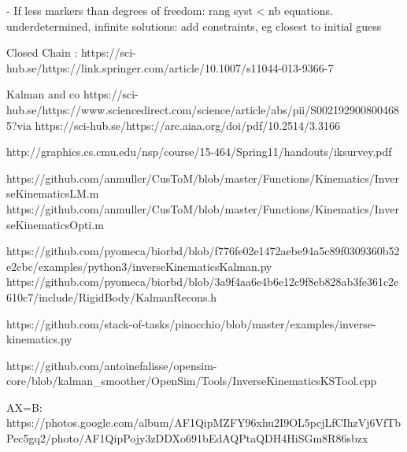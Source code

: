 - If less markers than degrees of freedom: rang syst < nb equations. underdetermined, infinite solutions: add constraints, eg closest to initial guess 




Closed Chain :
https://sci-hub.se/https://link.springer.com/article/10.1007/s11044-013-9366-7



Kalman and co
https://sci-hub.se/https://www.sciencedirect.com/science/article/abs/pii/S0021929008004685?via%
https://sci-hub.se/https://arc.aiaa.org/doi/pdf/10.2514/3.3166



http://graphics.cs.cmu.edu/nsp/course/15-464/Spring11/handouts/iksurvey.pdf

https://github.com/anmuller/CusToM/blob/master/Functions/Kinematics/InverseKinematicsLM.m 
https://github.com/anmuller/CusToM/blob/master/Functions/Kinematics/InverseKinematicsOpti.m

https://github.com/pyomeca/biorbd/blob/f776fe02e1472aebe94a5c89f0309360b52e2cbc/examples/python3/inverseKinematicsKalman.py
https://github.com/pyomeca/biorbd/blob/3a9f4aa6e4b6e12c9f8eb828ab3fe361c2e610c7/include/RigidBody/KalmanRecons.h

https://github.com/stack-of-tasks/pinocchio/blob/master/examples/inverse-kinematics.py

https://github.com/antoinefalisse/opensim-core/blob/kalman_smoother/OpenSim/Tools/InverseKinematicsKSTool.cpp



AX=B:  https://photos.google.com/album/AF1QipMZFY96xhu2I9OL5pcjLfCIhzVj6VfTbPec5gq2/photo/AF1QipPojy3zDDXo691bEdAQPtaQDH4HiSGm8R86sbzx






